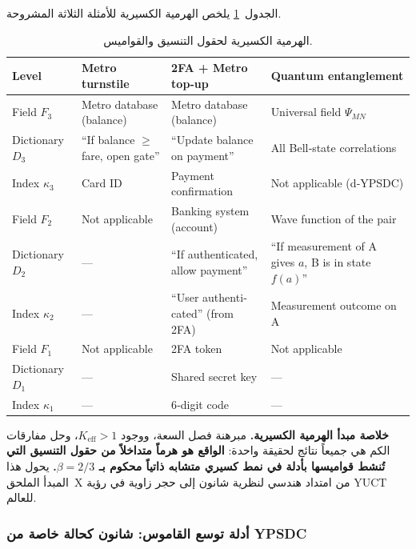 \documentclass[12pt,a4paper]{article}
\theoremstyle{remark}
\begin{document}
	الجدول~\ref{tab:fractal-examples} يلخص الهرمية الكسيرية للأمثلة الثلاثة المشروحة.
	
	\begin{otherlanguage}{english}
		\begin{table}[htbp]
			\centering
			\caption{الهرمية الكسيرية لحقول التنسيق والقواميس.}
			\label{tab:fractal-examples}
			\small
			\begin{tabular}{p{2.2cm} p{3.5cm} p{3.5cm} p{3.5cm}}
				\toprule
				\textbf{Level} & \textbf{Metro turnstile} & \textbf{2FA + Metro top‑up} & \textbf{Quantum entanglement} \\
				\midrule
				Field $F_3$ & Metro database (balance) & Metro database (balance) & Universal field $\Psi_{MN}$ \\
				Dictionary $D_3$ & ``If balance $\ge$ fare, open gate'' & ``Update balance on payment'' & All Bell‑state correlations \\
				Index $\kappa_3$ & Card ID & Payment confirmation & Not applicable (d‑YPSDC) \\
				\midrule
				Field $F_2$ & Not applicable & Banking system (account) & Wave function of the pair \\
				Dictionary $D_2$ & --- & ``If authenticated, allow payment'' & ``If measurement of A gives $a$, B is in state $f(a)$'' \\
				Index $\kappa_2$ & --- & ``User authenticated'' (from 2FA) & Measurement outcome on A \\
				\midrule
				Field $F_1$ & Not applicable & 2FA token & Not applicable \\
				Dictionary $D_1$ & --- & Shared secret key & --- \\
				Index $\kappa_1$ & --- & 6‑digit code & --- \\
				\bottomrule
			\end{tabular}
		\end{table}
	\end{otherlanguage}
	
	\noindent
	\textbf{خلاصة مبدأ الهرمية الكسيرية.}
	مبرهنة فصل السعة، ووجود \(K_{\mathrm{eff}}>1\)، وحل مفارقات الكم هي جميعاً نتائج لحقيقة واحدة: \textbf{الواقع هو هرماً متداخلاً من حقول التنسيق التي تُنشط قواميسها بأدلة في نمط كسيري متشابه ذاتياً محكوم بـ \(\beta=2/3\).} يحول هذا المبدأ الملحق~X من امتداد هندسي لنظرية شانون إلى حجر زاوية في رؤية YUCT للعالم.
	
	\subsubsection{أدلة توسع القاموس: شانون كحالة خاصة من YPSDC}
	
\end{document}
